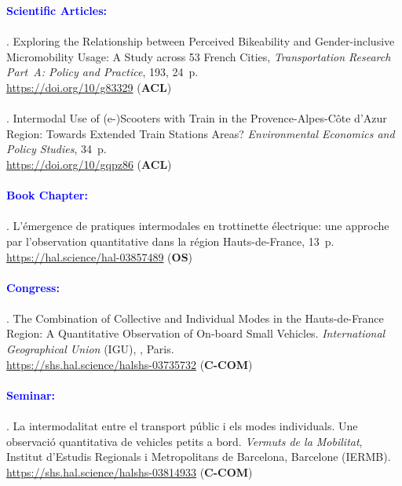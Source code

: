 \begin{refsegment}
    \begin{tcolorbox}[colback=white!5!white,
                      colframe=blue!75!blue,
                      title=Valorization
                      \\
                      Chapitre~4]
\Large{\textcolor{blue}{\textbf{Scientific Articles:}}}
    \\\\
\small{\textcolor{blue}{\textcite{moinse_exploring_2025}}. Exploring the Relationship between Perceived Bikeability and Gender-inclusive Micromobility Usage: A Study across 53 French Cities, \textsl{Transportation Research Part~A: Policy and Practice}, 193, 24~p.
\\
\footnotesize{\url{https://doi.org/10/g83329}} (\textbf{ACL})}
    \\\\
\small{\textcolor{blue}{\textcite{moinse_intermodal_2022}}. Intermodal Use of (e-)Scooters with Train in the Provence-Alpes-Côte d’Azur Region: Towards Extended Train Stations Areas? \textsl{Environmental Economics and Policy Studies}, 34~p. 
\\
\footnotesize{\url{https://doi.org/10/gqpz86}} (\textbf{ACL})}
    \\\\
\Large{\textcolor{blue}{\textbf{Book Chapter:}}}
    \\\\
\small{\textcolor{blue}{\textcite{moinse_lemergence_2022}}. L'émergence de pratiques intermodales en trottinette électrique: une approche par l'observation quantitative dans la région Hauts-de-France, 13~p.
\\
\footnotesize{\url{https://hal.science/hal-03857489}} (\textbf{OS})}
    \\\\
\Large{\textcolor{blue}{\textbf{Congress:}}}
    \\\\
\small{\textcolor{blue}{\textcite{moinse_combination_2022}}. The Combination of Collective and Individual Modes in the Hauts-de-France Region: A Quantitative Observation of On-board Small Vehicles. \textsl{International Geographical Union} (IGU), , Paris. 
\\
\footnotesize{\url{https://shs.hal.science/halshs-03735732}} (\textbf{C-COM})}
    \\\\
\Large{\textcolor{blue}{\textbf{Seminar:}}}
    \\\\
\small{\textcolor{blue}{\textcite{moinse_intermodalitat_2022}}. La intermodalitat entre el transport públic i els modes individuals. Une observació quantitativa de vehicles petits a bord. \textsl{Vermuts de la Mobilitat}, Institut d'Estudis Regionals i Metropolitans de Barcelona, Barcelone (IERMB).
\\
\footnotesize{\url{https://shs.hal.science/halshs-03814933}} (\textbf{C-COM})}
    \end{tcolorbox}


\end{refsegment}
